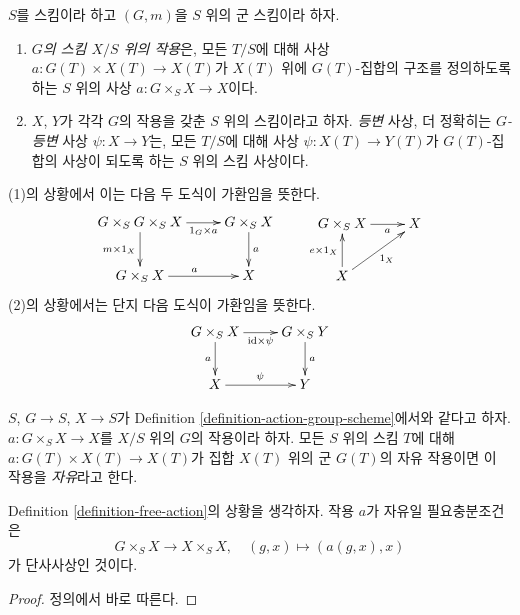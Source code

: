 \begin{definition}
\label{definition-action-group-scheme}
$S$를 스킴이라 하고 $(G, m)$을 $S$ 위의 군 스킴이라 하자.
\begin{enumerate}
\item {\it $G$의 스킴 $X/S$ 위의 작용}은, 모든 $T/S$에 대해 사상
$a : G(T) \times X(T) \to X(T)$가 $X(T)$ 위에 $G(T)$-집합의 구조를 정의하도록 하는
$S$ 위의 사상 $a : G \times_S X \to X$이다.
\item $X$, $Y$가 각각 $G$의 작용을 갖춘 $S$ 위의 스킴이라고 하자. {\it 등변} 사상, 더 정확히는
{\it $G$-등변} 사상 $\psi : X \to Y$는, 모든 $T/S$에 대해 사상
$\psi : X(T) \to Y(T)$가 $G(T)$-집합의 사상이 되도록 하는 $S$ 위의 스킴 사상이다.
\end{enumerate}
\end{definition}

\noindent
(1)의 상황에서 이는 다음 두 도식이 가환임을 뜻한다.
\begin{equation}
\label{equation-action}
\vcenter{
\xymatrix{
G \times_S G \times_S X \ar[r]_-{1_G \times a} \ar[d]_{m \times 1_X} &
G \times_S X \ar[d]^a \\
G \times_S X \ar[r]^a & X
}
}
\quad\quad
\vcenter{
\xymatrix{
G \times_S X \ar[r]_-a & X \\
X\ar[u]^{e \times 1_X} \ar[ru]_{1_X}
}
}
\end{equation}
(2)의 상황에서는 단지 다음 도식이 가환임을 뜻한다.
$$
\xymatrix{
G \times_S X \ar[r]_-{\text{id} \times \psi} \ar[d]_a &
G \times_S Y \ar[d]^a \\
X \ar[r]^\psi & Y
}
$$

\begin{definition}
\label{definition-free-action}
$S$, $G \to S$, $X \to S$가 Definition \ref{definition-action-group-scheme}에서와 같다고 하자.
$a : G \times_S X \to X$를 $X/S$ 위의 $G$의 작용이라 하자. 모든 $S$ 위의 스킴 $T$에 대해
$a : G(T) \times X(T) \to X(T)$가 집합 $X(T)$ 위의 군 $G(T)$의 자유 작용이면 이 작용을 {\it 자유}라고 한다.
\end{definition}

\begin{lemma}
\label{lemma-free-action}
Definition \ref{definition-free-action}의 상황을 생각하자. 작용 $a$가 자유일 필요충분조건은
$$
G \times_S X \to X \times_S X, \quad (g, x) \mapsto (a(g, x), x)
$$
가 단사사상인 것이다.
\end{lemma}

\begin{proof}
정의에서 바로 따른다.
\end{proof}







